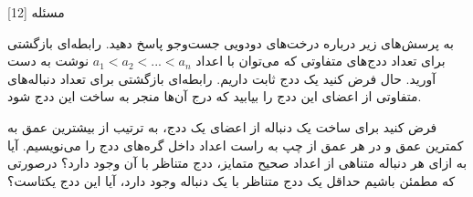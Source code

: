 ‌مسئله [12]


% 
%
%
% 
به پرسش‌های زیر درباره درخت‌های دودویی جست‌وجو پاسخ دهید.
رابطه‌ای بازگشتی برای تعداد ددج‌های متفاوتی که می‌توان با اعداد
$a_1 < a_2 < ... < a_n$
نوشت به دست آورید. حال فرض کنید یک ددج ثابت داریم. رابطه‌ای بازگشتی برای تعداد دنباله‌های متفاوتی از اعضای این ددج را بیابید که درج آن‌ها منجر به ساخت این ددج شود.

فرض کنید برای ساخت یک دنباله از اعضای یک ددج، به ترتیب از بیشترین عمق به کمترین عمق و در هر عمق از چپ به راست اعداد داخل گره‌های ددج را می‌نویسیم. آیا به ازای هر دنباله متناهی از اعداد صحیح متمایز، ددج متناظر با آن وجود دارد؟ درصورتی که مطمئن باشیم حداقل یک ددج متناظر با یک دنباله وجود دارد، آیا این ددج یکتاست؟


